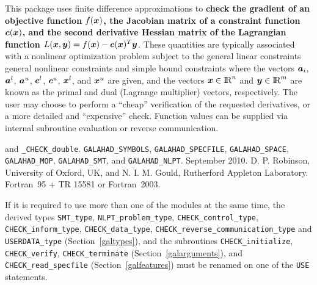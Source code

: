 \documentclass{galahad}
\newcommand{\packagename}{CHECK}
\newcommand{\fullpackagename}{\libraryname\_\packagename}
\begin{document}
\galheader


\galsummary This package uses finite difference approximations to {\bf
check the gradient of an objective function $f({\bm{x}})$, the Jacobian
matrix of a constraint function ${\bm{c}}({\bm{x}})$, and the second
derivative Hessian matrix of the Lagrangian function $L({\bm{x}},{\bm{y}}) =
f({\bm{x}}) - {\bm{c}}({\bm{x}})^T {\bm{y}}$}.  These quantities are typically
associated with a nonlinear optimization problem
subject to the general linear constraints
general nonlinear constraints
and simple bound constraints
where the vectors ${\bm{a}}_{i}$, ${\bm{a}}^{l}$, ${\bm{a}}^{u}$, ${\bm{c}}^{l}$,
${\bm{c}}^{u}$, ${\bm{x}}^{l}$, and ${\bm{x}}^{u}$ are given, and the vectors
${\bm{x}}\in\hbox{I\hskip -1.5pt R}^n$ and ${\bm{y}}\in\hbox{I\hskip -1.5pt R}^m$ are known as the primal and dual (Lagrange
multiplier) vectors, respectively.  The user may choose to perform a ``cheap''
verification of the requested derivatives, or a more detailed
and ``expensive'' check.  Function values can be supplied via internal
subroutine evaluation or reverse communication.


\galattributes
\galversions{\tt  \fullpackagename\_single} and {\tt \fullpackagename\_double}.
\galuses 
{\tt GALAHAD\_SY\-M\-BOLS},
{\tt GAL\-AHAD\_SPECFILE},
{\tt GALAHAD\_SPACE},
{\tt GALAHAD\_MOP},
{\tt GALAHAD\_SMT}, and
{\tt GALAHAD\_NLPT}.
\galdate September 2010.
\galorigin D. P. Robinson, University of Oxford, UK, and
N. I. M. Gould, Rutherford Appleton Laboratory.
\gallanguage Fortran~95 + TR 15581 or Fortran~2003. 


\galhowto




\noindent
If it is required to use more than one of the modules at the same time, 
the derived types
{\tt SMT\_type}, 
{\tt NLPT\_problem\_type}, 
{\tt \packagename\_\-control\_type}, 
{\tt \packagename\_inform\_type},
{\tt \packagename\_data\_type},
{\tt \packagename\_reverse\_communication\_type} and
{\tt USERDATA\_\-type}
(Section~\ref{galtypes}),
and the subroutines
{\tt \packagename\_initialize}, 
{\tt \packagename\_verify},
{\tt \packagename\_terminate}
(Section~\ref{galarguments}),
and 
{\tt \packagename\_read\_specfile}
(Section~\ref{galfeatures})
must be renamed on one of the {\tt USE} statements.
\end{document}
